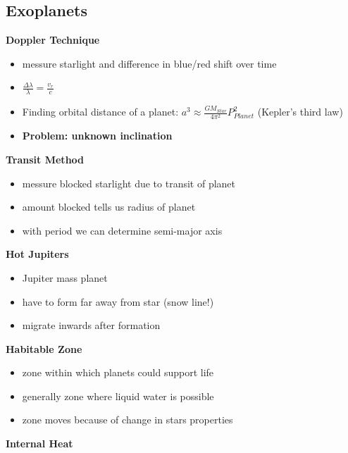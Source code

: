 \documentclass{article}
\theoremstyle{sltheorem}
\begin{document}
\subsection{Exoplanets}
\textbf{Doppler Technique}
\begin{itemize}
    \item messure starlight and difference in blue/red shift over time
    \item $\frac{\Delta\lambda}{\lambda}=\frac{v_r}{c}$
    \item Finding orbital distance of a planet: $a^3\approx \frac{GM_{Star}}{4\pi^2}P_{Planet}^2$ (Kepler's third law)
    \item \textbf{Problem: unknown inclination}
\end{itemize}
\textbf{Transit Method}
\begin{itemize}
    \item messure blocked starlight due to transit of planet
    \item amount blocked tells us radius of planet
    \item with period we can determine semi-major axis
\end{itemize}
\textbf{Hot Jupiters}
\begin{itemize}
    \item Jupiter mass planet
    \item have to form far away from star (snow line!)
    \item migrate inwards after formation
\end{itemize}
\textbf{Habitable Zone}
\begin{itemize}
    \item zone within which planets could support life
    \item generally zone where liquid water is possible
    \item zone moves because of change in stars properties
\end{itemize}
\textbf{Internal Heat}
\end{document}
